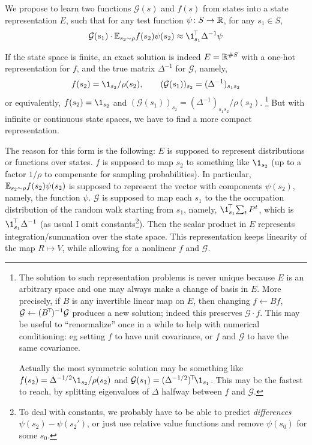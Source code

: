 \documentclass[11pt,a4paper]{article}
\newcommand{\green}{\mathcal{G}}
\begin{document}
We propose to learn two functions $\green(s)$ and $f(s)$ from states into
a state representation $E$, such that for any test function $\psi\colon
S\to {\mathbb{R}}$, for any $s_1\in S$,
\begin{equation}
\label{eq:greenrep}
\green(s_1)\cdot \E_{s_2\sim \rho}
f(s_2)\psi(s_2)\approx \transp{\1_{s_1}}\,\Delta^{-1} \psi
\end{equation}

If the state space is finite, an exact
solution is indeed $E={\mathbb{R}}^{\#S}$ with a one-hot representation for $f$,
and the true matrix $\Delta^{-1}$ for $\green$, namely,
\begin{equation}
f(s_2)=\1_{s_2}/\rho(s_2),\qquad
(\green(s_1))_{s_2}=(\Delta^{-1})_{s_1s_2}
\end{equation}
or equivalently, $f(s_2)=\1_{s_2}$ and
$(\green(s_1))_{s_2}=(\Delta^{-1})_{s_1s_2}/\rho(s_2)$. \footnote{The solution to
such representation problems is never unique because $E$ is an arbitrary
space and one may always make a change of basis in $E$. More precisely,
if $B$ is any invertible linear map on $E$, then changing $f\gets Bf$,
$\green\gets (\transp{B})^{-1}\green$ produces a new solution; indeed
this preserves $\green\cdot f$. This may
be useful to ``renormalize'' once in a while to help with numerical
conditioning: eg setting $f$ to have
unit covariance, or $f$ and $\green$ to have the same covariance.

Actually the most symmetric solution may be something like
$f(s_2)=\Delta^{-1/2}\1_{s_2}/\rho(s_2)$ and
$\green(s_1)=\transp{(\Delta^{-1/2})}\1_{s_1}$. This may be the fastest
to reach, by splitting eigenvalues of $\Delta$ halfway between $f$ and
$\green$.}
But with infinite or continuous state spaces, we have to find a more
compact representation.

The reason for this form is the following: $E$ is supposed to represent
distributions or functions over states. $f$ is supposed to map $s_2$ to
something like
$\1_{s_2}$ (up to a factor $1/\rho$ to compensate for sampling
probabilities). 
In
particular, $\mathbb{E}_{s_2\sim \rho}f(s_2)\psi(s_2)$ is supposed to represent
the vector with components $\psi(s_2)$, namely, the function $\psi$. $\green$ is supposed to map each
$s_1$ to the
the occupation
distribution of the random walk starting from $s_1$, namely,
$\transp{\1_{s_1}}\sum_t P^t$, which is $\transp{\1_{s_1}}\,\Delta^{-1}$
(as usual I
omit constants\footnote{To deal with constants, we probably have to be
able to predict \emph{differences} $\psi(s_2)-\psi(s_2')$, or just use
relative value functions and remove $\psi(s_0)$ for some $s_0$.}). Then the scalar product in
$E$ represents integration/summation over the state space.
This representation keeps linearity of the map $R\mapsto V$, while
allowing for a nonlinear $f$ and $\green$.
\end{document}
